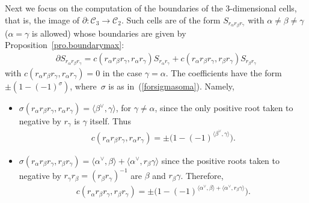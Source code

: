 \documentclass[pdftex]{sigma}
\numberwithin{equation}{section}
\begin{document}
Next we focus on the computation of the boundaries of the $3$-dimensional cells, that is, the image of $\partial\colon \mathcal{C}_{3}\longrightarrow \mathcal{C}_{2}$. Such cells are of the form $S_{r_{\alpha }r_{\beta
}r_{\gamma }}$ with $\alpha \neq \beta \neq \gamma $ ($\alpha =\gamma $ is allowed) whose boundaries are given by Proposition~\ref{pro.boundarymax}:
\begin{gather*}
\partial S_{r_{\alpha }r_{\beta }r_{\gamma }}=c ( r_{\alpha }r_{\beta}r_{\gamma },r_{\alpha }r_{\gamma } ) S_{r_{\alpha }r_{\gamma}}+c ( r_{\alpha }r_{\beta }r_{\gamma },r_{\beta }r_{\gamma } )S_{r_{\beta }r_{\gamma }}
\end{gather*}
with $c ( r_{\alpha }r_{\beta }r_{\gamma },r_{\alpha }r_{\gamma } ) =0$ in the case $\gamma =\alpha $. The coefficients have the form $\pm ( 1-(-1) ^{\sigma } ) $, where~$\sigma $ is as in~(\ref{forsigmasoma}). Namely,
\begin{itemize}\itemsep=0pt
\item $\sigma ( r_{\alpha }r_{\beta }r_{\gamma },r_{\alpha }r_{\gamma} ) =\langle \beta ^{\vee },\gamma \rangle $, for $\gamma \neq \alpha $, since the only positive root taken to negative by $r_{\gamma }$ is $\gamma
$ itself. Thus
\begin{gather}
c ( r_{\alpha }r_{\beta }r_{\gamma },r_{\alpha }r_{\gamma } ) =\pm \big( 1-(-1) ^{\langle \beta ^{\vee },\gamma \rangle }\big).\label{eq.cabcac}
\end{gather}
\item $\sigma ( r_{\alpha }r_{\beta }r_{\gamma },r_{\beta }r_{\gamma} ) =\langle \alpha ^{\vee },\beta \rangle +\langle \alpha ^{\vee},r_{\beta }\gamma \rangle $ since the positive roots taken to negative by $r_{\gamma }r_{\beta }= ( r_{\beta }r_{\gamma } ) ^{-1}$ are $\beta $ and $r_{\beta }\gamma $. Therefore,
\begin{gather} \label{eq.cabcbc}
c ( r_{\alpha }r_{\beta }r_{\gamma },r_{\beta }r_{\gamma } ) =\pm \big( 1-(-1) ^{\langle \alpha ^{\vee },\beta \rangle +\langle \alpha ^{\vee },r_{\beta }\gamma \rangle }\big).
\end{gather}
\end{itemize}
\end{document}
